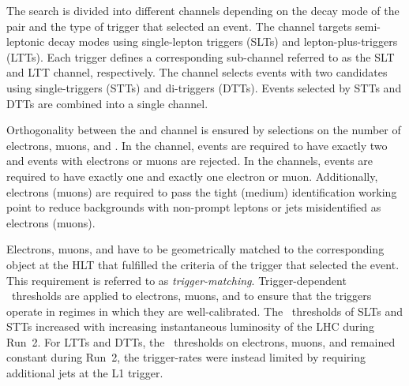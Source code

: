 The search is divided into different channels depending on the decay mode of the
\tauleptonC pair and the type of trigger that selected an event. The \lephad
channel targets semi-leptonic decay modes using single-lepton triggers (SLTs)
and lepton-plus-\tauhadvis triggers (LTTs). Each trigger defines a corresponding
sub-channel referred to as the \lephad SLT and \lephad LTT channel,
respectively. The \hadhad channel selects events with two \tauhadvis candidates
using single-\tauhadvis triggers (STTs) and di-\tauhadvis triggers (DTTs).
Events selected by STTs and DTTs are combined into a single channel.


Orthogonality between the \lephad and \hadhad channel is ensured by selections
on the number of electrons, muons, and \tauhadvis. In the \hadhad channel,
events are required to have exactly two \tauhadvis and events with electrons or
muons are rejected. In the \lephad channels, events are required to have exactly
one \tauhadvis and exactly one electron or muon. Additionally, electrons (muons)
are required to pass the tight (medium) identification working point to reduce
backgrounds with non-prompt leptons or jets misidentified as electrons (muons).

Electrons, muons, and \tauhadvis have to be geometrically matched to the
corresponding object at the HLT that fulfilled the criteria of the trigger that
selected the event.
This requirement is referred to as \emph{trigger-matching}. Trigger-dependent
\pT~thresholds are applied to electrons, muons, and \tauhadvis to ensure that
the triggers operate in regimes in which they are well-calibrated. The
\pT~thresholds of SLTs and STTs increased with increasing instantaneous
luminosity of the LHC during Run~2. For LTTs and DTTs, the \pT~thresholds on
electrons, muons, and \tauhadvis remained constant during Run~2, the
trigger-rates were instead limited by requiring additional jets at the L1
trigger.

